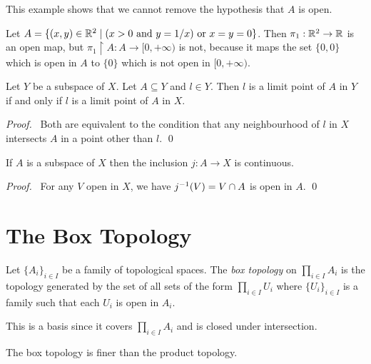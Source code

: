 \begin{example}
    This example shows that we cannot remove the hypothesis that $A$ is open.

    Let $A = \{ (x,y) \in \mathbb{R}^2 \mid (x > 0 \text{ and } y = 1/x) \text{ or } x=y=0 \}$.
    Then $\pi_1 : \mathbb{R}^2 \rightarrow \mathbb{R}$ is an open map, but $\pi_1 \restriction A : A \rightarrow [0, + \infty)$
    is not, because it maps the set $\{ 0,0 \}$ which is open in $A$ to $\{0\}$ which is not open in $[0,+\infty)$.
\end{example}

\begin{proposition}
    \label{proposition:limit_point_subspace}
    Let $Y$ be a subspace of $X$. Let $A \subseteq Y$ and $l \in Y$. Then $l$ is a limit point
    of $A$ in $Y$ if and only if $l$ is a limit point of $A$ in $X$.
\end{proposition}

\begin{proof}
    \pf\ Both are equivalent to the condition that any neighbourhood of $l$ in $X$ intersects $A$ in a point other than $l$. \qed
\end{proof}

\begin{theorem}
    If $A$ is a subspace of $X$ then the inclusion $j : A \rightarrow X$ is continuous.
\end{theorem}

\begin{proof}
    \pf\ For any $V$ open in $X$, we have ${j}^{-1}(V) = V \cap A$ is open in $A$. \qed
\end{proof}

\section{The Box Topology}

\begin{definition}
    Let $\{ A_i \}_{i \in I}$ be a family of topological spaces. The \emph{box topology} on $\prod_{i \in I} A_i$ is the topology generated by the set of all sets
    of the form $\prod_{i \in I} U_i$ where $\{ U_i \}_{i \in I}$ is a family such that each $U_i$ is open in $A_i$.
\end{definition}

This is a basis since it covers $\prod_{i \in I} A_i$ and is closed under intersection.

\begin{proposition}
    The box topology is finer than the product topology.
\end{proposition}

